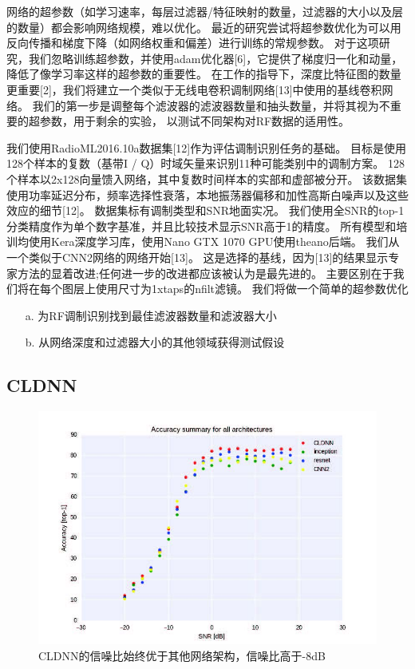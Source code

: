 网络的超参数（如学习速率，每层过滤器/特征映射的数量，过滤器的大小以及层的数量）都会影响网络规模，难以优化。
最近的研究尝试将超参数优化为可以用反向传播和梯度下降（如网络权重和偏差）进行训练的常规参数。
对于这项研究，我们忽略训练超参数，并使用adam优化器[6]，它提供了梯度归一化和动量，降低了像学习率这样的超参数的重要性。
在工作的指导下，深度比特征图的数量更重要[2]，我们将建立一个类似于无线电卷积调制网络[13]中使用的基线卷积网络。
我们的第一步是调整每个滤波器的滤波器数量和抽头数量，并将其视为不重要的超参数，用于剩余的实验，
以测试不同架构对RF数据的适用性。\par

我们使用RadioML2016.10a数据集[12]作为评估调制识别任务的基础。
目标是使用128个样本的复数（基带I / Q）时域矢量来识别11种可能类别中的调制方案。 
128个样本以2x128向量馈入网络，其中复数时间样本的实部和虚部被分开。
该数据集使用功率延迟分布，频率选择性衰落，本地振荡器偏移和加性高斯白噪声以及这些效应的细节[12]。
数据集标有调制类型和SNR地面实况。
我们使用全SNR的top-1分类精度作为单个数字基准，并且比较技术显示SNR高于1的精度。
所有模型和培训均使用Kera深度学习库，使用Nano GTX 1070 GPU使用theano后端。
我们从一个类似于CNN2网络的网络开始[13]。
这是选择的基线，因为[13]的结果显示专家方法的显着改进;任何进一步的改进都应该被认为是最先进的。
主要区别在于我们将在每个图层上使用尺寸为1xtaps的nfilt滤镜。
我们将做一个简单的超参数优化\par

\begin{enumerate}
	\item[a.] 为RF调制识别找到最佳滤波器数量和滤波器大小
	\item[b.] 从网络深度和过滤器大小的其他领域获得测试假设
\end{enumerate}


\subsection{CLDNN}

\begin{figure}[!h]
	\centering
	\includegraphics[scale=1]{figures/chapter_5/fig7}
	\caption{CLDNN的信噪比始终优于其他网络架构，信噪比高于-8dB}
\end{figure}

